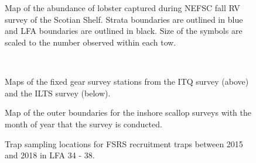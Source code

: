 \documentclass[11pt]{article}
\newcommand{\D}{.}
\newcommand{\e}{/SpinDr/backup/bio_data/bio.lobster/figures/LFA3438Framework2019/} %
\begin{document}
        \begin{figure}
        \centering
           \\
        \\
    
       \caption{Map of the abundance of lobster captured during NEFSC fall RV survey of the Scotian Shelf. Strata boundaries are outlined in blue and LFA  boundaries are outlined in black. Size of the symbols are scaled to the number observed within each tow.}
        \end{figure}
        \clearpage


     \begin{figure}
    \centering
        \\
        \caption{Maps of the fixed gear survey stations from the ITQ survey (above) and the ILTS survey (below).}
    \end{figure}

\begin{figure}
    \centering
        \caption{Map of the outer boundaries for the inshore scallop surveys with the month of year that the survey is conducted.}
    \end{figure}

   \begin{figure}
    \centering
        \caption{Trap sampling locations for FSRS recruitment traps between 2015 and 2018 in LFA 34 - 38.}

    \end{figure}
\end{document}
